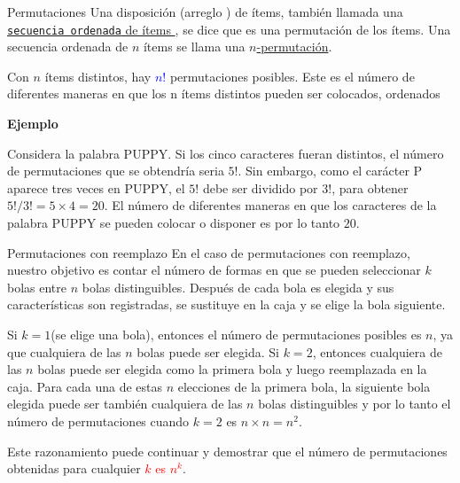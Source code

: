 \documentclass[10pt]{beamer}
\begin{document}
\begin{frame}{Permutaciones}
Una disposici\'on (arreglo ) de \'items, tambi\'en llamada una \underline{\texttt{secuencia ordenada} de \'items }, se dice que es una permutaci\'on de los \'items. Una secuencia ordenada de $n$ \'items  se llama una \underline{$n$-permutaci\'on}.



Con $n$ \'items  distintos, hay \textcolor{blue}{$n!$} permutaciones posibles. Este es el n\'umero de diferentes maneras en que los n \'items distintos pueden ser colocados, ordenados

\vspace{0.3cm}

\small{

\textbf{Ejemplo}

\vspace{0.2cm}
	
Considera la palabra PUPPY. Si los cinco caracteres fueran distintos, el n\'umero de permutaciones que se obtendr\'ia seria $5!$. Sin embargo, como el car\'acter P aparece tres veces en PUPPY, el $5!$ debe ser dividido por $3!$, para obtener $5!/3! = 5\times  4 = 20$. El n\'umero de diferentes maneras en que los caracteres de la palabra PUPPY se pueden colocar o disponer  es por lo tanto $20$.}

\end{frame}

\begin{frame}{Permutaciones con reemplazo}
En el caso de permutaciones con reemplazo, nuestro objetivo es contar el n\'umero de formas en que se pueden seleccionar $k$ bolas entre $n$ bolas distinguibles. Despu\'es de cada bola es elegida y sus caracter\'isticas son registradas, se sustituye en la caja y se elige la bola siguiente.

\vspace{0.2cm}

Si $k = 1$(se elige una bola), entonces el n\'umero de permutaciones posibles es $n$, ya que cualquiera de las $n$ bolas puede ser elegida. Si $k = 2$, entonces cualquiera de las $n$ bolas puede ser elegida como la primera bola y luego reemplazada en la caja. Para cada una de estas $n$ elecciones de la  primera bola, la siguiente bola elegida puede ser tambi\'en cualquiera de las $n$ bolas distinguibles y por lo tanto el n\'umero de permutaciones cuando $k = 2$ es $n\times n = n^2$.

\vspace{0.2cm}

Este razonamiento puede continuar y  demostrar que el n\'umero de permutaciones obtenidas para cualquier \textcolor{red}{$k$ es $n^k$}.

\end{frame}
\end{document}
